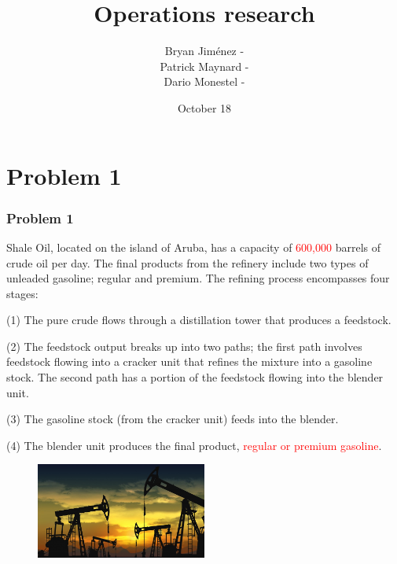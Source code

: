 \documentclass[10pt,svgnames,fragile]{beamer}
\subtitle{}
\institute[Tecnológico de Costa Rica]{ Project 5: Linear Programming Problems \\ Second Semester 2018 }	       \usetheme{CambridgeUS}
\author{
Bryan Jiménez -\\ 
Patrick Maynard -\\ 
Dario Monestel -\\
} %
\date{October 18}
\title[Operations research]{Operations research}
\begin{document}
\maketitle


\section{Problem 1}
\label{sec:org4f3d757}
\begin{frame}[label={sec:orge9abdcb}]{}

\frametitle{Problem 1}
Shale Oil, located on the island of Aruba, has a capacity of \textcolor{red}{600,000} barrels of crude oil per day. The final products from the refinery include two types of unleaded gasoline; regular and premium. The refining process encompasses four stages:

(1) The pure crude flows through a distillation tower that produces a feedstock.

(2) The feedstock output breaks up into two paths; the first path involves feedstock flowing into a cracker unit that refines the mixture into a gasoline stock. The second path has a portion of the feedstock flowing into the blender unit.

(3) The gasoline stock (from the cracker unit) feeds into the blender.

(4) The blender unit produces the final product, \textcolor{red}{regular or premium gasoline}.
\begin{figure}
\includegraphics[width=0.5\textwidth]{images/A.jpg}
\end{figure}

\end{frame}
\end{document}
